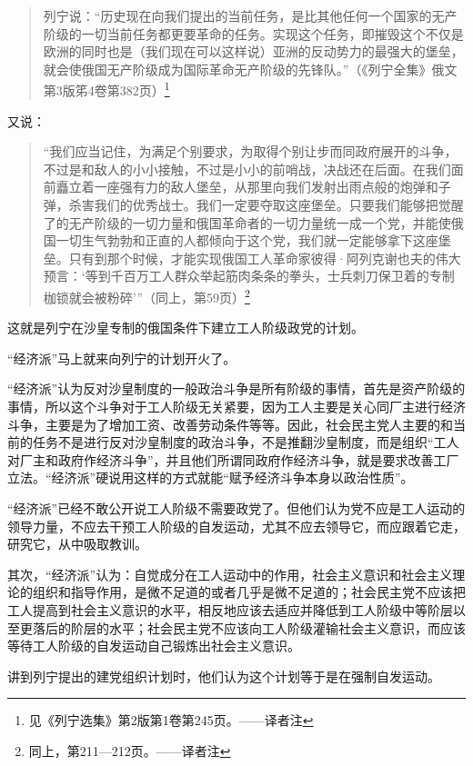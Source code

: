 \begin{quotation}
列宁说：“历史现在向我们提出的当前任务，是比其他任何一个国家的无产阶级的一切当前任务都更要革命的任务。实现这个任务，即摧毁这个不仅是欧洲的同时也是（我们现在可以这样说）亚洲的反动势力的最强大的堡垒，就会使俄国无产阶级成为国际革命无产阶级的先锋队。”（《列宁全集》俄文第3版笫4卷第382页）\footnote{见《列宁选集》第2版第1卷第245页。——译者注}
\end{quotation}

又说：

\begin{quotation}
“我们应当记住，为满足个别要求，为取得个别让步而同政府展开的斗争，不过是和敌人的小小接触，不过是小小的前哨战，决战还在后面。在我们面前矗立着一座强有力的敌人堡垒，从那里向我们发射出雨点般的炮弹和子弹，杀害我们的优秀战士。我们一定要夺取这座堡垒。只要我们能够把觉醒了的无产阶级的一切力量和俄国革命者的一切力量统一成一个党，并能使俄国一切生气勃勃和正直的人都倾向于这个党，我们就一定能够拿下这座堡垒。只有到那个时候，才能实现俄国工人革命家彼得·阿列克谢也夫的伟大预言：‘等到千百万工人群众举起筋肉条条的拳头，士兵刺刀保卫着的专制枷锁就会被粉碎’”（同上，第59页）\footnote{同上，第211—212页。——译者注}
\end{quotation}

这就是列宁在沙皇专制的俄国条件下建立工人阶级政党的计划。

“经济派”马上就来向列宁的计划开火了。

“经济派”认为反对沙皇制度的一般政治斗争是所有阶级的事情，首先是资产阶级的事情，所以这个斗争对于工人阶级无关紧要，因为工人主要是关心同厂主进行经济斗争，主要是为了增加工资、改善劳动条件等等。因此，社会民主党人主要的和当前的任务不是进行反对沙皇制度的政治斗争，不是推翻沙皇制度，而是组织“工人对厂主和政府作经济斗争”，并且他们所谓同政府作经济斗争，就是要求改善工厂立法。“经济派”硬说用这样的方式就能“赋予经济斗争本身以政治性质”。

“经济派”已经不敢公开说工人阶级不需要政党了。但他们认为党不应是工人运动的领导力量，不应去干预工人阶级的自发运动，尤其不应去领导它，而应跟着它走，研究它，从中吸取教训。

其次，“经济派”认为：自觉成分在工人运动中的作用，社会主义意识和社会主义理论的组织和指导作用，是微不足道的或者几乎是微不足道的；社会民主党不应该把工人提高到社会主义意识的水平，相反地应该去适应并降低到工人阶级中等阶层以至更落后的阶层的水平；社会民主党不应该向工人阶级灌输社会主义意识，而应该等待工人阶级的自发运动自己锻炼出社会主义意识。

讲到列宁提出的建党组织计划时，他们认为这个计划等于是在强制自发运动。

